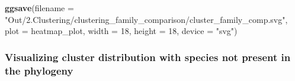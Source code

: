 \documentclass[
]{article}
\newenvironment{Shaded}{\begin{snugshade}}{\end{snugshade}}
\newcommand{\AttributeTok}[1]{\textcolor[rgb]{0.13,0.29,0.53}{#1}}
\newcommand{\DecValTok}[1]{\textcolor[rgb]{0.00,0.00,0.81}{#1}}
\newcommand{\FunctionTok}[1]{\textcolor[rgb]{0.13,0.29,0.53}{\textbf{#1}}}
\newcommand{\NormalTok}[1]{#1}
\newcommand{\StringTok}[1]{\textcolor[rgb]{0.31,0.60,0.02}{#1}}
\begin{document}


\begin{Shaded}
\begin{Highlighting}[]
\FunctionTok{ggsave}\NormalTok{(}\AttributeTok{filename =} \StringTok{"Out/2.Clustering/clustering\_family\_comparison/cluster\_family\_comp.svg"}\NormalTok{, }\AttributeTok{plot =}\NormalTok{ heatmap\_plot, }\AttributeTok{width =} \DecValTok{18}\NormalTok{, }\AttributeTok{height =} \DecValTok{18}\NormalTok{, }\AttributeTok{device =} \StringTok{"svg"}\NormalTok{)}
\end{Highlighting}
\end{Shaded}

\hypertarget{visualizing-cluster-distribution-with-species-not-present-in-the-phylogeny}{%
\subsubsection{Visualizing cluster distribution with species not present
in the
phylogeny}\label{visualizing-cluster-distribution-with-species-not-present-in-the-phylogeny}}
\end{document}
